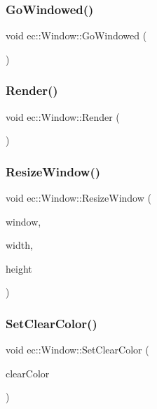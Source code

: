 \subsubsection{\texorpdfstring{Go\+Windowed()}{GoWindowed()}}
{\footnotesize\ttfamily void ec\+::\+Window\+::\+Go\+Windowed (\begin{DoxyParamCaption}{ }\end{DoxyParamCaption})}

\mbox{\label{classec_1_1_window_af0be4ef5101cfd9251511c402c1e9598}} 
\subsubsection{\texorpdfstring{Render()}{Render()}}
{\footnotesize\ttfamily void ec\+::\+Window\+::\+Render (\begin{DoxyParamCaption}{ }\end{DoxyParamCaption})\hspace{0.3cm}{\ttfamily [virtual]}}

\mbox{\label{classec_1_1_window_a95ea89916704775d858e441c8b7430cd}} 
\subsubsection{\texorpdfstring{Resize\+Window()}{ResizeWindow()}}
{\footnotesize\ttfamily void ec\+::\+Window\+::\+Resize\+Window (\begin{DoxyParamCaption}\item[{G\+L\+F\+Wwindow $\ast$}]{window,  }\item[{int}]{width,  }\item[{int}]{height }\end{DoxyParamCaption})\hspace{0.3cm}{\ttfamily [virtual]}}

\mbox{\label{classec_1_1_window_af0d59d99e745ebde21fed3b165543a52}} 
\subsubsection{\texorpdfstring{Set\+Clear\+Color()}{SetClearColor()}}
{\footnotesize\ttfamily void ec\+::\+Window\+::\+Set\+Clear\+Color (\begin{DoxyParamCaption}\item[{const glm\+::vec4 \&}]{clear\+Color }\end{DoxyParamCaption})}

